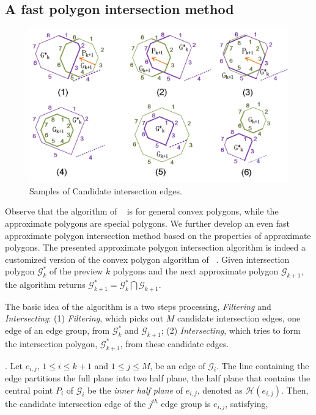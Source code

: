 
\subsection{A fast polygon intersection method}

\begin{figure}[tb!]
\centering
\includegraphics[scale=0.88]{figures/Fig-poly-edges.png}
\vspace{-1ex}
\caption{\small Samples of Candidate intersection edges.}
\vspace{-2ex}
\label{fig:poly-edges}
\end{figure}

Observe that the algorithm of ~\cite{ORourke:Intersection} is for general convex polygons, while the approximate polygons are special polygons. We further develop an even fast approximate polygon intersection method based on the properties of approximate polygons.
%
The presented approximate polygon intersection algorithm is indeed a customized version of the convex polygon algorithm of ~\cite{ORourke:Intersection}.
%
Given intersection polygon $\mathcal{G}^*_k$ of the preview $k$ polygons and the next approximate polygon $\mathcal{G}_{k+1}$, the algorithm returns $\mathcal{G}^*_{k+1} = \mathcal{G}^*_k  \bigcap \mathcal{G}_{k+1}$.

The basic idea of the algorithm is a two steps processing, \ie \emph{Filtering} and \emph{Intersecting}:
 (1) \emph{Filtering}, which picks out $M$ candidate intersection edges, one edge of an edge group, from $\mathcal{G}^*_k $ and $\mathcal{G}_{k+1}$;
 (2) \emph{Intersecting}, which tries to form the intersection polygon, \ie $\mathcal{G}^*_{k+1}$, from these candidate edges.



.
Let $e_{i,j}$, $1 \le i \le k+1$ and $1 \le j \le M$, be an edge of $\mathcal{G}_{i}$. The line containing the edge partitions the full plane into two half plane, the half plane that contains the central point $P_i$ of $\mathcal{G}_i$ be the \emph{inner half plane} of $e_{i,j}$, denoted as $\mathcal{H}(e_{i,j})$.
%
Then, the candidate intersection edge of the $j^{th}$ edge group is $e_{i,j}$, satisfying,


